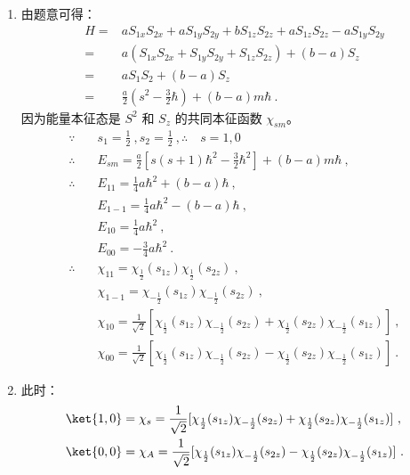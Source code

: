\subsection{ }
\begin{enumerate}
\item 由题意可得：\\
\begin{equation}
\begin{aligned}
H =& aS_{1x}S_{2x}+aS_{1y}S_{2y}+bS_{1z}S_{2z}+aS_{1z}S_{2z}-aS_{1y}S_{2y} \\
=& a(S_{1x}S_{2x}+S_{1y}S_{2y}+S_{1z}S_{2z})+(b-a)S_{z} \\
=& aS_{1}S_{2}+(b-a)S_z \\
=& \frac{a}{2}(s^{2}-\frac{3}{2}\hbar)+(b-a)m\hbar~.
\end{aligned}
\end{equation}
因为能量本征态是 $S^{2}$ 和 $S_{z}$ 的共同本征函数 $\chi_{sm}$。\\
\begin{equation}
\begin{aligned}
\because \quad & s_{1} = \frac{1}{2}~,s_{2}=\frac{1}{2}~, \therefore \quad s=1,0  \\
\therefore \quad & E_{sm} = \frac{a}{2}[s(s+1)\hbar^{2}-\frac{3}{2}\hbar^{2}]+(b-a)m\hbar ~, \\
\therefore \quad & E_{11} = \frac{1}{4}a\hbar^{2}+(b-a)\hbar ~, \\
& E_{1-1} = \frac{1}{4}a\hbar^{2}-(b-a)\hbar ~, \\
& E_{10} = \frac{1}{4}a\hbar^{2} ~, \\
& E_{00} = -\frac{3}{4}a\hbar^{2} ~.\\
\therefore \quad& \chi_{11}= \chi_{\frac{1}{2}}(s_{1z})\chi_{\frac{1}{2}}(s_{2z})~, \\
& \chi_{1-1} = \chi_{-\frac{1}{2}}(s_{1z})\chi_{-\frac{1}{2}}(s_{2z}) ~, \\
& \chi_{10} = \frac{1}{\sqrt{2}}[\chi_{\frac{1}{2}}(s_{1z})\chi_{-\frac{1}{2}}(s_{2z})+\chi_{\frac{1}{2}}(s_{2z})\chi_{-\frac{1}{2}}(s_{1z})]  ~,\\
& \chi_{00} = \frac{1}{\sqrt{2}}[\chi_{\frac{1}{2}}(s_{1z})\chi_{-\frac{1}{2}}(s_{2z})-\chi_{\frac{1}{2}}(s_{2z})\chi_{-\frac{1}{2}}(s_{1z})] ~. 
\end{aligned}
\end{equation}



\item 此时：\\
\begin{equation}
\begin{aligned}
& \ket{1,0}=\chi_{s}=\frac{1}{\sqrt{2}}[\chi_{\frac{1}{2}}(s_{1z})\chi_{-\frac{1}{2}}(s_{2z})+\chi_{\frac{1}{2}}(s_{2z})\chi_{-\frac{1}{2}}(s_{1z})] ~, \\
& \ket{0,0}=\chi_{A}=\frac{1}{\sqrt{2}}[\chi_{\frac{1}{2}}(s_{1z})\chi_{-\frac{1}{2}}(s_{2z})-\chi_{\frac{1}{2}}(s_{2z})\chi_{-\frac{1}{2}}(s_{1z})] ~.
\end{aligned}
\end{equation}

\end{enumerate}
